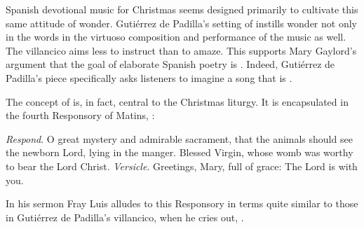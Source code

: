 Spanish devotional music for Christmas seems designed primarily to cultivate
this same attitude of wonder.
Gutiérrez de Padilla's setting of  instills
wonder not only in the words in the virtuoso composition and performance of the
music as well.
The villancico aims less to instruct than to amaze. 
This supports Mary Gaylord's argument that the goal of elaborate Spanish poetry
is .%
    \Autocite[227]{Gaylord:Poetry}
Indeed, Gutiérrez de Padilla's piece specifically asks listeners to imagine a
song that is .

The concept of  is, in fact, central to the Christmas liturgy.
It is encapsulated in the fourth Responsory of Matins, :
\begin{quoting}
    \emph{Respond}. O great mystery and admirable sacrament, that the animals
    should see the newborn Lord, lying in the manger.
    Blessed Virgin, whose womb was worthy to bear the Lord Christ.\newline
    \emph{Versicle}. Greetings, Mary, full of grace: The Lord is with you.%
        \Autocite 
        [175: .]
        {Catholic:Breviarium1631}
\end{quoting}
In his sermon Fray Luis alludes to this Responsory in terms quite similar to
those in Gutiérrez de Padilla's villancico, when he cries out, .%
    \Autocite
    [38: ]
    {LuisdeGranada:Xmas}

